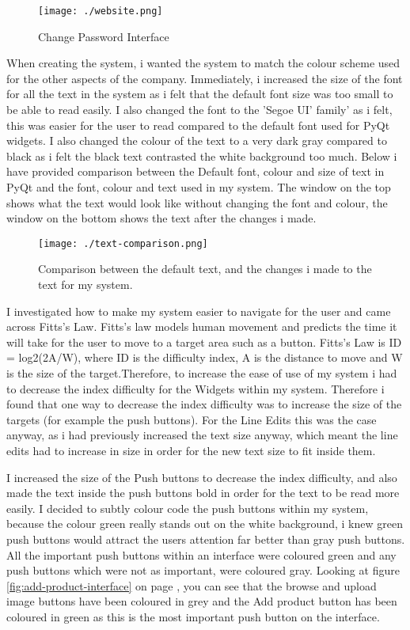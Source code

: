 \begin{figure}[H]
    \texttt{[image: ./website.png]}
    \caption{Change Password Interface} \label{fig:website.}
\end{figure}

When creating the system, i wanted the system to match the colour scheme used for the other aspects of the company. Immediately, i increased the size of the font for all the text in the system as i felt that the default font size was too small to be able to read easily. I also changed the font to the 'Segoe UI' family' as i felt, this was easier for the user to read compared to the default font used for PyQt widgets. I also changed the colour of the text to a very dark gray compared to black as i felt the black text contrasted the white background too much. Below i have provided comparison between the Default font, colour and size of text in PyQt and the font, colour and text used in my system. The window on the top shows what the text would look like without changing the font and colour, the window on the bottom shows the text after the changes i made.

\begin{figure}[H]
    \texttt{[image: ./text-comparison.png]}
    \caption{Comparison between the default text, and the changes i made to the text for my system.} \label{fig:text-comparison}
\end{figure}

I investigated how to make my system easier to navigate for the user and came across Fitts's Law. Fitts's law models human movement and predicts the time it will take for the user to move to a target area such as a button. Fitts's Law is ID = log2(2A/W), where ID is the difficulty index, A is the distance to move and W is the size of the target.Therefore, to increase the ease of use of my system i had to decrease the index difficulty for the Widgets within my system. Therefore i found that one way to decrease the index difficulty was to increase the size of the targets (for example the push buttons). For the Line Edits this was the case anyway, as i had previously increased the text size anyway, which meant the line edits had to increase in size in order for the new text size to fit inside them.\par

I increased the size of the Push buttons to decrease the index difficulty, and also made the text inside the push buttons bold in order for the text to be read more easily. I decided to subtly colour code the push buttons within my system, because the colour green really stands out on the white background, i knew green push buttons would attract the users attention far better than gray push buttons. All the important push buttons within an interface were coloured green and any push buttons which were not as important, were coloured gray. Looking at figure \ref{fig:add-product-interface} on page \pageref{fig:add-product-interface}, you can see that the browse and upload image buttons have been coloured in grey and the Add product button has been coloured in green as this is the most important push button on the interface. \par

